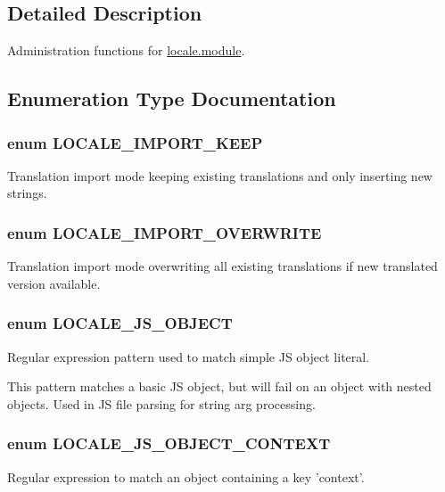 \subsection{Detailed Description}
Administration functions for \hyperlink{locale_8module}{locale.module}. 

\subsection{Enumeration Type Documentation}
\hypertarget{locale_8inc_a303136b14da01d0bdb7088444b3da25e}{
\subsubsection[{LOCALE\_\-IMPORT\_\-KEEP}]{\setlength{\rightskip}{0pt plus 5cm}enum {\bf LOCALE\_\-IMPORT\_\-KEEP}}}
\label{locale_8inc_a303136b14da01d0bdb7088444b3da25e}
Translation import mode keeping existing translations and only inserting new strings. \hypertarget{locale_8inc_afd5557a8da0f5c5b4f1965609c9488d5}{
\subsubsection[{LOCALE\_\-IMPORT\_\-OVERWRITE}]{\setlength{\rightskip}{0pt plus 5cm}enum {\bf LOCALE\_\-IMPORT\_\-OVERWRITE}}}
\label{locale_8inc_afd5557a8da0f5c5b4f1965609c9488d5}
Translation import mode overwriting all existing translations if new translated version available. \hypertarget{locale_8inc_ae1afc6234e8a78f1cd6d9731d376ca88}{
\subsubsection[{LOCALE\_\-JS\_\-OBJECT}]{\setlength{\rightskip}{0pt plus 5cm}enum {\bf LOCALE\_\-JS\_\-OBJECT}}}
\label{locale_8inc_ae1afc6234e8a78f1cd6d9731d376ca88}
Regular expression pattern used to match simple JS object literal.

This pattern matches a basic JS object, but will fail on an object with nested objects. Used in JS file parsing for string arg processing. \hypertarget{locale_8inc_ac1107b99261988edb0993dd5aafa7f34}{
\subsubsection[{LOCALE\_\-JS\_\-OBJECT\_\-CONTEXT}]{\setlength{\rightskip}{0pt plus 5cm}enum {\bf LOCALE\_\-JS\_\-OBJECT\_\-CONTEXT}}}
\label{locale_8inc_ac1107b99261988edb0993dd5aafa7f34}
Regular expression to match an object containing a key 'context'.

